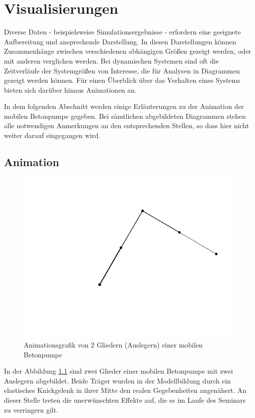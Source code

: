 \chapter{Visualisierungen} \label{ch:Visualisierung}

Diverse Daten - beispielsweise Simulationsergebnisse - erfordern eine geeignete Aufbereitung und ansprechende Darstellung. In diesen Darstellungen können Zusammenhänge zwischen verschiedenen abhängigen Größen gezeigt werden, oder mit anderen verglichen werden.
Bei dynamischen Systemen sind oft die Zeitverläufe der Systemgrößen von Interesse, die für Analysen in Diagrammen gezeigt werden können. Für einen Überblick über das Verhalten eines Systems bieten sich darüber hinaus Animationen an.

In dem folgenden Abschnitt werden einige Erläuterungen zu der Animation der mobilen Betonpumpe gegeben. Bei sämtlichen abgebildeten Diagrammen stehen alle notwendigen Anmerkungen an den entsprechenden Stellen, so dass hier nicht weiter darauf eingegangen wird.

\section{Animation}

\begin{figure}[h]
\centering
\includegraphics[width=0.7\linewidth]{animation01}
\caption[Animation Betonpumpe]{Animationsgrafik von 2 Gliedern (Auslegern) einer mobilen Betonpumpe}
\label{fig:animation}
\end{figure}

In der Abbildung \ref{fig:animation} sind zwei Glieder einer mobilen Betonpumpe mit zwei Auslegern abgebildet. Beide Träger wurden in der Modellbildung durch ein elastisches Knickgelenk in ihrer Mitte den realen Gegebenheiten angenähert. An dieser Stelle treten die unerwünschten Effekte auf, die es im Laufe des Seminars zu verringern gilt. 